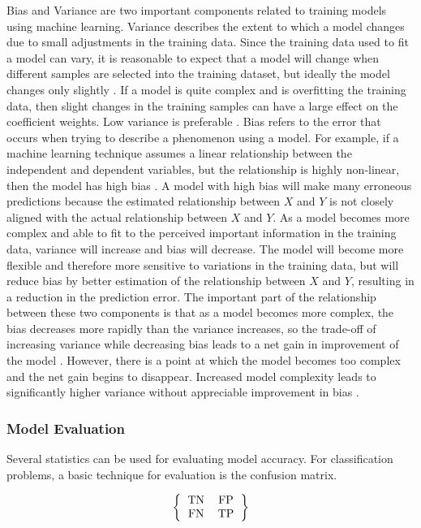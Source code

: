\documentclass[sigconf]{acmart}
\begin{document}
Bias and Variance are two important components related to training models using machine learning. Variance describes the extent to which a model changes due to small adjustments in the training data. Since the training data used to fit a model can vary, it is reasonable to expect that a model will change when different samples are selected into the training dataset, but ideally the model changes only slightly \cite{cite03}. If a model is quite complex and is overfitting the training data, then slight changes in the training samples can have a large effect on the coefficient weights. Low variance is preferable \cite{cite03}.
Bias refers to the error that occurs when trying to describe a phenomenon using a model. For example, if a machine learning technique assumes a linear relationship between the independent and dependent variables, but the relationship is highly non-linear, then the model has high bias \cite{cite03}. A model with high bias will make many erroneous predictions because the estimated relationship between \(X\) and \(Y\) is not closely aligned with the actual relationship between \(X\) and \(Y\).
As a model becomes more complex and able to fit to the perceived important information in the training data, variance will increase and bias will decrease. The model will become more flexible and therefore more sensitive to variations in the training data, but will reduce bias by better estimation of the relationship between \(X\) and \(Y\), resulting in a reduction in the prediction error. The important part of the relationship between these two components is that as a model becomes more complex, the bias decreases more rapidly than the variance increases, so the trade-off of increasing variance while decreasing bias leads to a net gain in improvement of the model \cite{cite03}. However, there is a point at which the model becomes too complex and the net gain begins to disappear. Increased model complexity leads to significantly higher variance without appreciable improvement in bias \cite{cite03}. 

\subsubsection{Model Evaluation}

Several statistics can be used for evaluating model accuracy. For classification problems, a basic technique for evaluation is the confusion matrix.

\[ 
\left \{
  \begin{tabular}{ccc}
  TN & FP \\
  FN & TP 
  \end{tabular}
\right \}
\]
\end{document}
